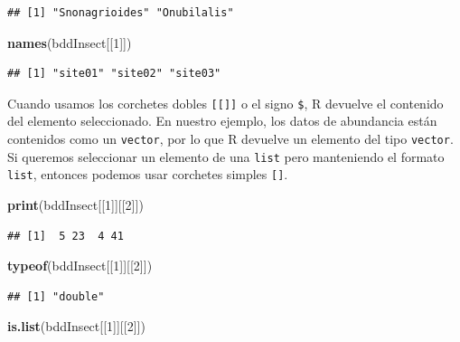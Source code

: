 \documentclass[
]{book}
\newenvironment{Shaded}{\begin{snugshade}}{\end{snugshade}}
\newcommand{\DecValTok}[1]{\textcolor[rgb]{0.00,0.00,0.81}{#1}}
\newcommand{\KeywordTok}[1]{\textcolor[rgb]{0.13,0.29,0.53}{\textbf{#1}}}
\newcommand{\NormalTok}[1]{#1}
\begin{document}
\begin{verbatim}
## [1] "Snonagrioides" "Onubilalis"
\end{verbatim}

\begin{Shaded}
\begin{Highlighting}[]
\KeywordTok{names}\NormalTok{(bddInsect[[}\DecValTok{1}\NormalTok{]])}
\end{Highlighting}
\end{Shaded}

\begin{verbatim}
## [1] "site01" "site02" "site03"
\end{verbatim}

Cuando usamos los corchetes dobles \texttt{{[}{[}{]}{]}} o el signo \texttt{\$}, R devuelve el contenido del elemento seleccionado. En nuestro ejemplo, los datos de abundancia están contenidos como un \texttt{vector}, por lo que R devuelve un elemento del tipo \texttt{vector}. Si queremos seleccionar un elemento de una \texttt{list} pero manteniendo el formato \texttt{list}, entonces podemos usar corchetes simples \texttt{{[}{]}}.

\begin{Shaded}
\begin{Highlighting}[]
\KeywordTok{print}\NormalTok{(bddInsect[[}\DecValTok{1}\NormalTok{]][[}\DecValTok{2}\NormalTok{]])}
\end{Highlighting}
\end{Shaded}

\begin{verbatim}
## [1]  5 23  4 41
\end{verbatim}

\begin{Shaded}
\begin{Highlighting}[]
\KeywordTok{typeof}\NormalTok{(bddInsect[[}\DecValTok{1}\NormalTok{]][[}\DecValTok{2}\NormalTok{]])}
\end{Highlighting}
\end{Shaded}

\begin{verbatim}
## [1] "double"
\end{verbatim}

\begin{Shaded}
\begin{Highlighting}[]
\KeywordTok{is.list}\NormalTok{(bddInsect[[}\DecValTok{1}\NormalTok{]][[}\DecValTok{2}\NormalTok{]])}
\end{Highlighting}
\end{Shaded}
\end{document}
